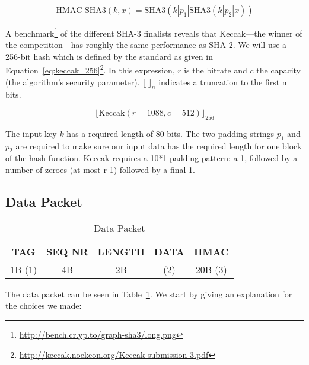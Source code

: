 \documentclass[a4paper]{article}
\begin{document}
\begin{equation} \label{eq:hmac_sha3}
    \text{HMAC-SHA3}(k, x) = \text{SHA3}(k | p_1 | \text{SHA3}(k | p_2 | x))
\end{equation}

A benchmark\footnote{\url{http://bench.cr.yp.to/graph-sha3/long.png}} of the different SHA-3 finalists reveals that Keccak---the winner of the competition---has roughly the same performance as SHA-2. We will use a 256-bit hash which is defined by the standard as given in Equation~\ref{eq:keccak_256}\footnote{\url{http://keccak.noekeon.org/Keccak-submission-3.pdf}}. In this expression, $r$ is the bitrate and $c$ the capacity (the algorithm's security parameter). ${\lfloor}{\ }{\rfloor}_n$ indicates a truncation to the first n bits.

\begin{equation} \label{eq:keccak_256}
    {\lfloor}\text{Keccak}(r = 1088, c = 512){\rfloor}_{256}
\end{equation}

The input key $k$ has a required length of 80 bits. The two padding strings $p_1$ and $p_2$ are required to make sure our input data has the required length for one block of the hash function. Keccak requires a 10*1-padding pattern: a 1, followed by a number of zeroes (at most r-1) followed by a final 1.

\subsection{Data Packet}

\begin{table}[H]
    \begin{center}
        \begin{tabular}{| c | c | c | c | c |}
            \hline
            TAG & SEQ NR & LENGTH & DATA & HMAC \\ \hline
            1B (1) & 4B & 2B & (2) & 20B (3) \\
            \hline
        \end{tabular}
    \end{center}
    
    \caption{Data Packet}
    \label{tab:data_packet}
\end{table}

The data packet can be seen in Table~\ref{tab:data_packet}. We start by giving an explanation for the choices we made:
\end{document}
